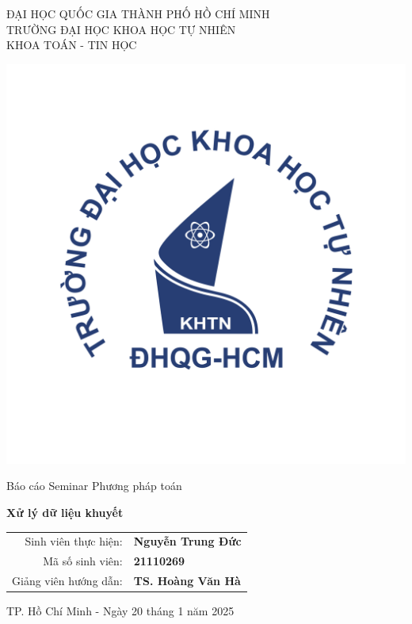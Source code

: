 \begin{center}	
    \large{ĐẠI HỌC QUỐC GIA THÀNH PHỐ HỒ CHÍ MINH}\\
    \large{TRƯỜNG ĐẠI HỌC KHOA HỌC TỰ NHIÊN}\\
    \large{KHOA TOÁN - TIN HỌC}
    \vspace{0.5in}
    
    \includegraphics[scale=0.3]{img/hcmus.png}
    
    \huge{Báo cáo Seminar Phương pháp toán}
    \vspace{0.2in}
    
    {\huge\textbf{Xử lý dữ liệu khuyết}}\\
    \vspace{1in}
\end{center}

\begin{center}
    \begin{tabular}{rl}
        \large Sinh viên thực hiện:& \large\textbf{Nguyễn Trung Đức} \\
        \large Mã số sinh viên:& \large\textbf{21110269} \\
        \large Giảng viên hướng dẫn:& \large\textbf{TS. Hoàng Văn Hà}
    \end{tabular}
\end{center}

\vfill

\begin{center}
    \large{TP. Hồ Chí Minh - Ngày 20 tháng 1 năm 2025}
\end{center}

\thispagestyle{empty}